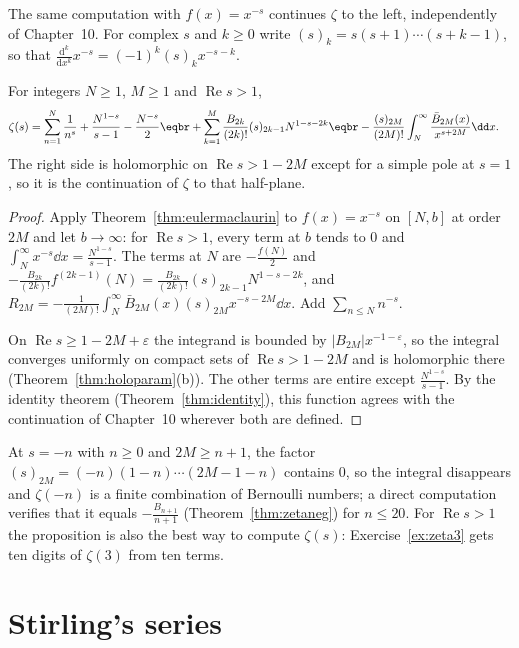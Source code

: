 The same computation with $f(x)=x^{-s}$ continues $\zeta$ to the left, independently of Chapter~10. For complex $s$ and $k\ge0$ write
$(s)_k=s(s+1)\cdots(s+k-1)$, so that $\frac{\mathrm d^k}{\mathrm dx^k}x^{-s}=(-1)^k(s)_kx^{-s-k}$.

\begin{proposition}\label{prop:zetaem}
For integers $N\ge1$, $M\ge1$ and $\operatorname{Re}s>1$,
\[
\begin{aligned}\zeta(s)&=\sum_{n=1}^N\frac1{n^s}+\frac{N^{1-s}}{s-1}-\frac{N^{-s}}2\eqbr+\sum_{k=1}^M\frac{B_{2k}}{(2k)!}(s)_{2k-1}N^{1-s-2k}\eqbr-\frac{(s)_{2M}}{(2M)!}\int_N^\infty\frac{\bar B_{2M}(x)}{x^{s+2M}}\dd x.\end{aligned}
\]
The right side is holomorphic on $\operatorname{Re}s>1-2M$ except for a simple pole at $s=1$, so it is the continuation of $\zeta$ to that half-plane.
\end{proposition}
\begin{proof}
Apply Theorem~\ref{thm:eulermaclaurin} to $f(x)=x^{-s}$ on $[N,b]$ at order $2M$ and let $b\to\infty$: for $\operatorname{Re}s>1$, every term at $b$ tends to $0$ and
$\int_N^\infty x^{-s}\dd x=\frac{N^{1-s}}{s-1}$. The terms at $N$ are $-\frac{f(N)}2$ and $-\frac{B_{2k}}{(2k)!}f^{(2k-1)}(N)=\frac{B_{2k}}{(2k)!}(s)_{2k-1}N^{1-s-2k}$, and
$R_{2M}=-\frac1{(2M)!}\int_N^\infty\bar B_{2M}(x)(s)_{2M}x^{-s-2M}\dd x$. Add $\sum_{n\le N}n^{-s}$.

On $\operatorname{Re}s\ge1-2M+\varepsilon$ the integrand is bounded by $|B_{2M}|x^{-1-\varepsilon}$, so the integral converges uniformly on compact sets of
$\operatorname{Re}s>1-2M$ and is holomorphic there (Theorem~\ref{thm:holoparam}(b)). The other terms are entire except $\frac{N^{1-s}}{s-1}$. By the identity theorem
(Theorem~\ref{thm:identity}), this function agrees with the continuation of Chapter~10 wherever both are defined.
\end{proof}

At $s=-n$ with $n\ge0$ and $2M\ge n+1$, the factor $(s)_{2M}=(-n)(1-n)\cdots(2M-1-n)$ contains $0$, so the integral disappears and $\zeta(-n)$ is a
finite combination of Bernoulli numbers; a direct computation verifies that it equals $-\frac{B_{n+1}}{n+1}$ (Theorem~\ref{thm:zetaneg}) for $n\le20$. For
$\operatorname{Re}s>1$ the proposition is also the best way to compute $\zeta(s)$: Exercise~\ref{ex:zeta3} gets ten digits of $\zeta(3)$ from ten terms.

\section{Stirling's series}


